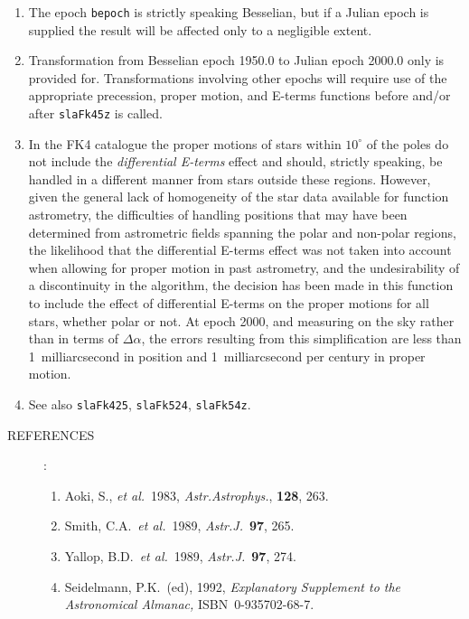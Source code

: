 \documentclass[11pt,fleqn,twoside]{article}
\renewcommand{\_}{{\tt\char'137}}     %
\newlength{\oldspacing}
\newcommand{\refs}[1]
{
  \goodbreak
  \setlength{\oldspacing}{\topsep}
  \setlength{\topsep}{0.3ex}
  \begin{description}
    \item[REFERENCES]:
        #1
  \end{description}
  \setlength{\topsep}{\oldspacing}
}
\begin{document}
{
 \begin{enumerate}
  \item The epoch {\tt bepoch} is strictly speaking Besselian, but
        if a Julian epoch is supplied the result will be
        affected only to a negligible extent.
  \item Transformation from Besselian epoch 1950.0 to Julian epoch
        2000.0 only is provided for.  Transformations involving other
        epochs will require use of the appropriate precession,
        proper motion, and E-terms functions before and/or
        after {\tt slaFk45z} is called.
  \item In the FK4 catalogue the proper motions of stars within
        $10^{\circ}$ of the poles do not include the {\it differential
        E-terms}\/ effect and should, strictly speaking, be handled
        in a different manner from stars outside these regions.
        However, given the general lack of homogeneity of the star
        data available for function astrometry, the difficulties of
        handling positions that may have been determined from
        astrometric fields spanning the polar and non-polar regions,
        the likelihood that the differential E-terms effect was not
        taken into account when allowing for proper motion in past
        astrometry, and the undesirability of a discontinuity in
        the algorithm, the decision has been made in this function to
        include the effect of differential E-terms on the proper
        motions for all stars, whether polar or not.  At epoch 2000,
        and measuring on the sky rather than in terms of $\Delta\alpha$,
        the errors resulting from this simplification are less than
        1~milliarcsecond in position and 1~milliarcsecond per
        century in proper motion.
  \item See also {\tt slaFk425}, {\tt slaFk524}, {\tt slaFk54z}.
 \end{enumerate}
}
\refs
{
 \begin{enumerate}
  \item Aoki, S., {\it et al.}\ 1983, {\it Astr.Astrophys.}, {\bf 128}, 263.
  \item Smith, C.A.\ {\it et al.}\ 1989,  {\it Astr.J.}\ {\bf 97}, 265.
  \item Yallop, B.D.\ {\it et al.}\ 1989, {\it Astr.J.}\ {\bf 97}, 274.
  \item Seidelmann, P.K.\ (ed), 1992, {\it Explanatory
        Supplement to the Astronomical Almanac,}\/ ISBN~0-935702-68-7.
 \end{enumerate}
}
\end{document}
